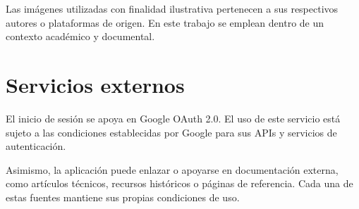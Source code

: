 Las imágenes utilizadas con finalidad ilustrativa pertenecen a sus respectivos autores o plataformas de origen. En este trabajo se emplean dentro de un contexto académico y documental.

\section{Servicios externos}

El inicio de sesión se apoya en Google OAuth 2.0. El uso de este servicio está sujeto a las condiciones establecidas por Google para sus APIs y servicios de autenticación.

Asimismo, la aplicación puede enlazar o apoyarse en documentación externa, como artículos técnicos, recursos históricos o páginas de referencia. Cada una de estas fuentes mantiene sus propias condiciones de uso.
